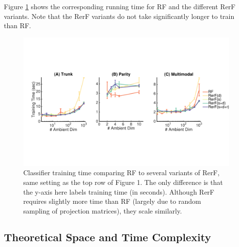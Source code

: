\documentclass{article} %
\begin{document}
Figure \ref{fig:time} shows the corresponding running time for RF and the different RerF variants.  Note that the RerF variants do not take significantly longer to train than RF.  



\begin{figure}[h]
\begin{center}
\includegraphics[trim=0in 3in 0in 3in, clip=true, width=\linewidth]{../Figures/pdf/Fig2_Time}
\end{center}
\caption{Classifier training time comparing RF to several variants of RerF, same setting as the top row of Figure 1. The only difference is that the y-axis here labels training time (in seconds). Although RerF requires slightly more time than RF (largely due to random sampling of projection matrices), they scale similarly.}
\label{fig:time}
\end{figure}

\subsection{Theoretical Space and Time Complexity}
\end{document}
